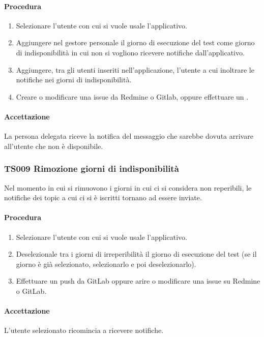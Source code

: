 		\paragraph*{Procedura}
			\begin{enumerate}
				\item Selezionare l'utente con cui si vuole usale l'applicativo.
				\item Aggiungere nel gestore personale il giorno di esecuzione del test come giorno di indisponibilità in cui non si vogliono ricevere notifiche dall'applicativo.
				\item Aggiungere, tra gli utenti inseriti nell'applicazione, l'utente a cui inoltrare le notifiche nei giorni di indisponibilità.
				\item Creare o modificare una issue da Redmine o Gitlab, oppure effettuare un . 
			\end{enumerate}
		
		\paragraph*{Accettazione}
		La persona delegata riceve la notifica del messaggio che sarebbe dovuta arrivare all'utente che non è disponibile.
		
	\subsubsection{TS009 Rimozione giorni di indisponibilità}
		Nel momento in cui si rimuovono i giorni in cui ci si considera non reperibili, le notifiche dei topic a cui ci si è iscritti tornano ad essere inviate.
		
		\paragraph*{Procedura}
			\begin{enumerate}
				\item Selezionare l'utente con cui si vuole usale l'applicativo.
				\item Deselezionale tra i giorni di irreperibilità il giorno di esecuzione del test (se il giorno è già selezionato, selezionarlo e poi deselezionarlo).
				\item Effettuare un push da GitLab oppure arire o modificare una issue su Redmine o GitLab.
			\end{enumerate}
		
		\paragraph*{Accettazione}
		L'utente selezionato ricomincia a ricevere notifiche.